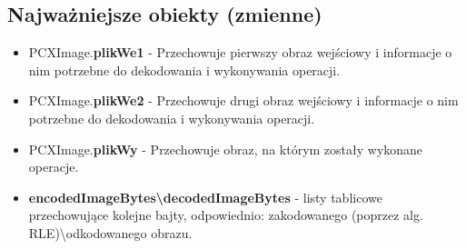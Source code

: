 \documentclass{article}
\begin{document}
\subsection{Najważniejsze obiekty (zmienne)}
\begin{itemize}
\item PCXImage.\textbf{plikWe1} - Przechowuje pierwszy obraz wejściowy i informacje o nim potrzebne do dekodowania i wykonywania operacji.
\item PCXImage.\textbf{plikWe2} - Przechowuje drugi obraz wejściowy i informacje o nim potrzebne do dekodowania i wykonywania operacji.
\item PCXImage.\textbf{plikWy} -  Przechowuje obraz, na którym zostały wykonane operacje.
\item \textbf{encodedImageBytes\textbackslash decodedImageBytes} - listy tablicowe przechowujące kolejne bajty, odpowiednio: zakodowanego (poprzez alg. RLE)\textbackslash  odkodowanego obrazu.
\end{itemize}
\end{document}
